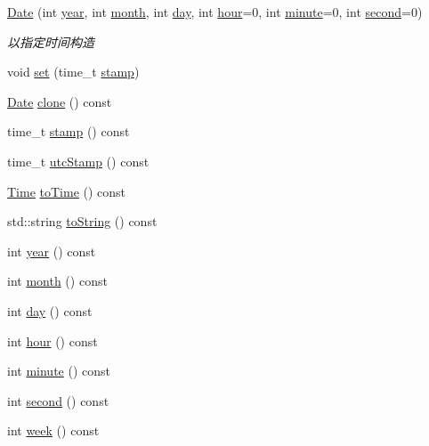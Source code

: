 \begin{DoxyCompactItemize}
\item 
\hyperlink{classec_1_1Date_a1dae4bdb08788d69fcbbb0a0233e27a1}{Date} (int \hyperlink{classec_1_1Date_ad8ff77d7111044313c6d07c1096c7330}{year}, int \hyperlink{classec_1_1Date_a8f1a6ea36ce7a64d2aa43c93a992bcd5}{month}, int \hyperlink{classec_1_1Date_a0544c98d04060feb7345092fb60b8065}{day}, int \hyperlink{classec_1_1Date_a5c5252eb904dba193e2347f955d986f6}{hour}=0, int \hyperlink{classec_1_1Date_a572776fe397fd2e25455f23a9de91d2d}{minute}=0, int \hyperlink{classec_1_1Date_a62f978e3fff3e38682bd9c4876beea5d}{second}=0)
\begin{DoxyCompactList}\small\item\em 以指定时间构造 \end{DoxyCompactList}\item 
void \hyperlink{classec_1_1Date_a991e12c24956f398a2d86ddaf8e99e2f}{set} (time\-\_\-t \hyperlink{classec_1_1Date_ae376652bff3f8476f948c14cb00601c5}{stamp})
\item 
\hyperlink{classec_1_1Date}{Date} \hyperlink{classec_1_1Date_ae94b1e3c919d58e5539088e863d1ba0d}{clone} () const 
\item 
time\-\_\-t \hyperlink{classec_1_1Date_ae376652bff3f8476f948c14cb00601c5}{stamp} () const 
\item 
time\-\_\-t \hyperlink{classec_1_1Date_ad9ef9967be21c60db8a78dc5d0e46ab4}{utc\-Stamp} () const 
\item 
\hyperlink{classec_1_1Time}{Time} \hyperlink{classec_1_1Date_a37f8cee14d869d9b132700f8568270de}{to\-Time} () const 
\item 
std\-::string \hyperlink{classec_1_1Date_a0566e90d744f4d1d8d5490a9be7a5bbc}{to\-String} () const 
\item 
int \hyperlink{classec_1_1Date_ad8ff77d7111044313c6d07c1096c7330}{year} () const 
\item 
int \hyperlink{classec_1_1Date_a8f1a6ea36ce7a64d2aa43c93a992bcd5}{month} () const 
\item 
int \hyperlink{classec_1_1Date_a0544c98d04060feb7345092fb60b8065}{day} () const 
\item 
int \hyperlink{classec_1_1Date_a5c5252eb904dba193e2347f955d986f6}{hour} () const 
\item 
int \hyperlink{classec_1_1Date_a572776fe397fd2e25455f23a9de91d2d}{minute} () const 
\item 
int \hyperlink{classec_1_1Date_a62f978e3fff3e38682bd9c4876beea5d}{second} () const 
\item 
int \hyperlink{classec_1_1Date_a9fd30981481e444ae07f908b447ce639}{week} () const 

\end{DoxyCompactItemize}
